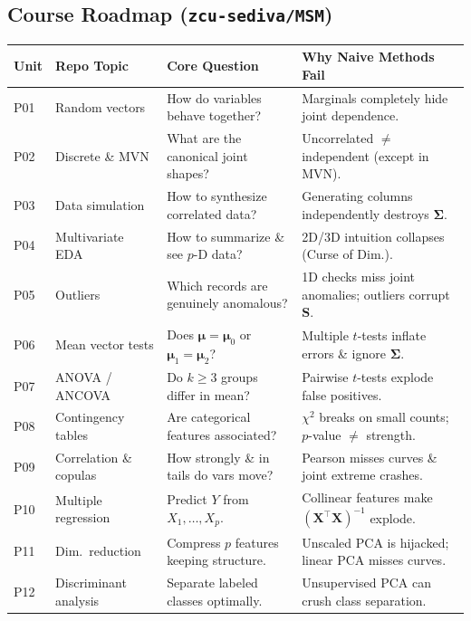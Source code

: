 \documentclass[11pt, a4paper]{article}
\begin{document}
\subsection{Course Roadmap (\texttt{zcu-sediva/MSM})}

\begin{table}[h!]
\centering
\small
\begin{tabularx}{\textwidth}{>{\raggedright\arraybackslash}p{1.2cm} >{\raggedright\arraybackslash}p{3.9cm} >{\raggedright\arraybackslash}p{4.6cm} >{\raggedright\arraybackslash}X}
\toprule
\textbf{Unit} & \textbf{Repo Topic} & \textbf{Core Question} & \textbf{Why Naive Methods Fail} \\
\midrule
P01 & Random vectors & How do variables behave together? & Marginals completely hide joint dependence. \\
P02 & Discrete \& MVN & What are the canonical joint shapes? & Uncorrelated $\neq$ independent (except in MVN). \\
P03 & Data simulation & How to synthesize correlated data? & Generating columns independently destroys $\boldsymbol{\Sigma}$. \\
P04 & Multivariate EDA & How to summarize \& see $p$-D data? & 2D/3D intuition collapses (Curse of Dim.). \\
P05 & Outliers & Which records are genuinely anomalous? & 1D checks miss joint anomalies; outliers corrupt $\mathbf{S}$. \\
P06 & Mean vector tests & Does $\boldsymbol{\mu} = \boldsymbol{\mu}_0$ or $\boldsymbol{\mu}_1 = \boldsymbol{\mu}_2$? & Multiple $t$-tests inflate errors \& ignore $\boldsymbol{\Sigma}$. \\
P07 & ANOVA / ANCOVA & Do $k \ge 3$ groups differ in mean? & Pairwise $t$-tests explode false positives. \\
P08 & Contingency tables & Are categorical features associated? & $\chi^2$ breaks on small counts; $p$-value $\neq$ strength. \\
P09 & Correlation \& copulas & How strongly \& in tails do vars move? & Pearson misses curves \& joint extreme crashes. \\
P10 & Multiple regression & Predict $Y$ from $X_1, \dots, X_p$. & Collinear features make $(\mathbf{X}^\top\mathbf{X})^{-1}$ explode. \\
P11 & Dim.\ reduction & Compress $p$ features keeping structure. & Unscaled PCA is hijacked; linear PCA misses curves. \\
P12 & Discriminant analysis & Separate labeled classes optimally. & Unsupervised PCA can crush class separation. \\
\bottomrule
\end{tabularx}
\end{table}
\end{document}
